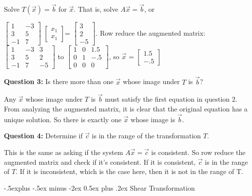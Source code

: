 \documentclass[10pt,landscape]{article}
\makeatletter
\renewcommand{\subsection}{\@startsection{subsection}{2}{0mm}%
                                {-.5explus -.5ex minus -2ex}%
                                {0.5ex plus .2ex}%
                                {\normalfont\footnotesize\bfseries}}
\makeatother
\begin{document}
\begin{multicols}{4}
{{Solve $T(\vec{x}) = \vec{b}$ for $\vec{x}$. That is, solve $A\vec{x}=\vec{b}$, or 

$\left[
\begin{array}{rr}
1 & -3\\ 3 & 5\\-1 & 7
\end{array}
\right]$ $\left[
\begin{array}{rr}x_1 \\ x_1
\end{array}
\right]$=  $\left[
\begin{array}{rr}3 \\2 \\ -5
\end{array}
\right]$. Row reduce the augmented matrix: $\left[
\begin{array}{rrr}
1 & -3 & 3 \\ 3 & 5 & 2 \\ -1 & 7 & -5
\end{array}
\right]$ to 
$\left[
\begin{array}{rrr}
1 & 0 & 1.5 \\ 0 & 1 & -.5 \\ 0 & 0 & 0
\end{array}
\right]$, so $\vec{x}$ =  $\left[
\begin{array}{rr}1.5 \\ -.5
\end{array}
\right]$

\textbf{Question 3:} Is there more than one $\vec{x}$ whose image under $T$ is $\vec{b}$?

Any $\vec{x}$ whose image under $T$ is $\vec{b}$ must satisfy the first equation in question 2. From analyzing the augmented matrix, it is clear that the original equation has a unique solution. So there is exactly one $\vec{x}$ whose image is $\vec{b}$.

\textbf{Question 4:} Determine if $\vec{c}$ is in the range of the transformation $T$.

This is the same as asking if the system $A\vec{x} = \vec{c}$ is consistent. So row reduce the augmented matrix and check if it's consistent. If it is consistent, $\vec{c}$ is in the range of $T$. If it is inconsistent, which is the case here, then it is not in the range of T.

\subsection{Shear Transformation}

}}
\end{multicols}
\end{document}
